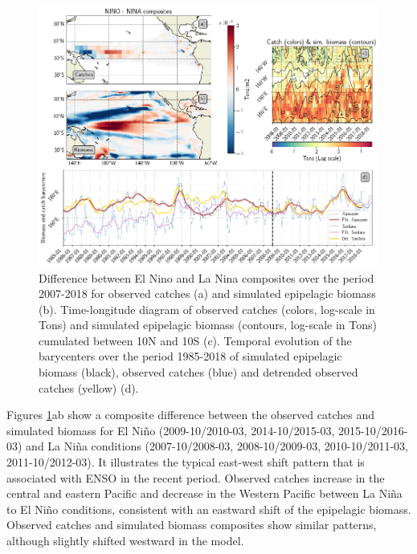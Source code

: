\begin{figure}[h!tp]
	\centering
	\includegraphics[scale=0.4]{figs/plot_validation_apecosm.png}
	\caption{Difference between El Nino and La Nina composites over the period 2007-2018 for observed catches (a) and simulated epipelagic biomass (b). Time-longitude diagram of observed catches (colors, log-scale in Tons) and simulated epipelagic biomass (contours, log-scale in Tons) cumulated between 10N and 10S (c). Temporal evolution of the barycenters over the period 1985-2018 of simulated epipelagic biomass (black), observed catches (blue) and detrended observed catches (yellow) (d).}
	\label{fig:apecosm_validation}
\end{figure}

Figures \ref{fig:apecosm_validation}ab show a composite difference between the observed catches and simulated biomass for El Niño (2009-10/2010-03, 2014-10/2015-03, 2015-10/2016-03) and La Niña conditions (2007-10/2008-03, 2008-10/2009-03, 2010-10/2011-03, 2011-10/2012-03). It illustrates the typical east-west shift pattern that is associated with ENSO in the recent period. Observed catches increase in the central and eastern Pacific and decrease in the Western Pacific between La Niña to El Niño conditions, consistent with an eastward shift of the epipelagic biomass. Observed catches and simulated biomass composites show similar patterns, although slightly shifted westward in the model.

